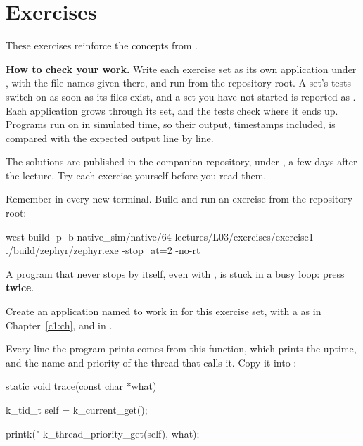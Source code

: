 
\section{Exercises}
\label{c3:sec:exercises}\label{c3:app:b}
These exercises reinforce the concepts from .

\begin{aside}
\textbf{How to check your work.} Write each exercise set as its own application under
, with the file names given there, and run  from the
repository root. A set’s tests switch on as soon as its files exist, and a set you have not started
is reported as . Each application grows through its set, and the tests check where it
ends up. Programs run on  in simulated time, so their output, timestamps included,
is compared with the expected output line by line.

The solutions are published in the companion repository, under
, a few days after the lecture. Try each exercise yourself
before you read them.
\end{aside}

Remember  in every new terminal. Build and run an exercise from the repository
root:

\begin{shell}
west build -p -b native_sim/native/64 lectures/L03/exercises/exercise1
./build/zephyr/zephyr.exe -stop_at=2 -no-rt
\end{shell}

A program that never stops by itself, even with , is stuck in a busy loop: press
 \textbf{twice}.

\label{c3:set:1}
Create an application named  to work in for this exercise set, with a
 as in Chapter~\ref{c1:ch}, and  in .

Every line the program prints comes from this function, which prints the uptime, and the name and
priority of the thread that calls it. Copy it into :

\begin{ccode}
static void trace(const char *what)
{
	k_tid_t self = k_current_get();

	printk("%
	       k_thread_priority_get(self), what);
}
\end{ccode}

